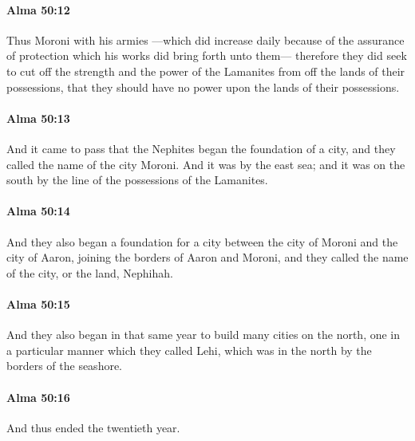 		\paragraph{Alma 50:12} %
			\label{ALMA-50-12}

			Thus Moroni with his armies
			---which did increase daily because of the assurance of protection
			which his works did bring forth unto them---
			therefore they did seek to cut off the strength and the power of the Lamanites
			from off the lands of their possessions,
			that they should have no power upon the lands of their possessions.

		\paragraph{Alma 50:13} %
			\label{ALMA-50-13}

			And it came to pass that the Nephites began the foundation of a city,
			and they called the name of the city Moroni.
			And it was by the east sea;
			and it was on the south by the line of the possessions of the Lamanites.

		\paragraph{Alma 50:14} %
			\label{ALMA-50-14}

			And they also began a foundation for a city
			between the city of Moroni and the city of Aaron,
			joining the borders of Aaron and Moroni,
			and they called the name of the city, or the land, Nephihah.

		\paragraph{Alma 50:15} %
			\label{ALMA-50-15}

			And they also began in that same year to build many cities on the north,
			one in a particular manner which they called Lehi,
			which was in the north by the borders of the seashore.

		\paragraph{Alma 50:16} %
			\label{ALMA-50-16}

			And thus ended the twentieth year.

